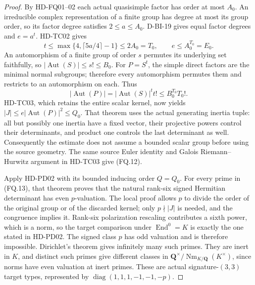 \begin{proof}
By HD-FQ01--02 each actual quasisimple factor has order at most $A_0$.
An irreducible complex representation of a finite group has degree
at most its group order, so its factor degree satisfies $2\le a\le A_0$.
D-BI-19 gives equal factor degrees and $e=a^t$.
HD-TC02 gives
\[
 t\le\max\{4,\lceil5a/4\rceil-1\}\le2A_0=T_0,
                 \qquad e\le A_0^{T_0}=E_0.
                                                               \tag{FQ.14}
\]
An automorphism of a finite group of order $s$ permutes its underlying
set faithfully, so $|\operatorname{Aut}(S)|\le s!\le B_0$.
For $P=S^t$, the simple direct factors are the minimal normal subgroups;
therefore every automorphism permutes them and restricts to an
automorphism on each.  Thus
\[
 |\operatorname{Aut}(P)|=|\operatorname{Aut}(S)|^t t!
                                  \le B_0^{T_0}T_0!.
                                                               \tag{FQ.15}
\]
HD-TC03, which retains the entire scalar kernel, now yields
$|J|\le e|\operatorname{Aut}(P)|^2\le Q_0$.
That theorem uses the actual generating inertia tuple: all but possibly
one inertia have a fixed vector, their projective powers control their
determinants, and product one controls the last determinant as well.
Consequently the estimate does not assume a bounded scalar group
before using the source geometry.
The same source Euler identity and Galois Riemann--Hurwitz argument
in HD-TC03 give (FQ.12).

Apply HD-PD02 with its bounded inducing order $Q=Q_0$.
For every prime in (FQ.13), that theorem proves that the natural
rank-six signed Hermitian determinant has even $p$-valuation.
The local proof allows $p$ to divide the order of the original group
or of the discarded kernel; only $p\nmid|J|$ is needed, and the
congruence implies it.  Rank-six polarization rescaling contributes
a sixth power, which is a norm, so the target comparison under
$\operatorname{End}^0=K$ is exactly the one stated in HD-PD02.
The signed class $p$ has odd valuation and is therefore impossible.
Dirichlet's theorem gives infinitely many such primes.  They are inert
in $K$, and distinct such primes give different classes in
$\mathbf Q^\times/\operatorname{Nm}_{K/\mathbf Q}(K^\times)$,
since norms have even valuation at inert primes.
These are actual signature-$(3,3)$ target types, represented by
$\operatorname{diag}(1,1,1,-1,-1,-p)$.
\end{proof}

